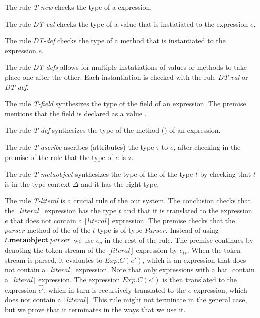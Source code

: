 The rule \textit{T-new} checks the type of a  expression. 

The rule \textit{DT-val} checks the type of a value that is instatiated to the expression $e$.

The rule \textit{DT-def} checks the type of a method  that is instantiated to the expression $e$.

The rule \textit{DT-defs} allows for multiple instatiations of values or methods to take place one after the other. Each instantiation is checked with the rule \textit{DT-val} or \textit{DT-def}.

The rule \textit{T-field} synthesizes the type of the field of an expression. The premise mentions that the field is declared as a value .

The rule \textit{T-def}  synthesizes the type of the method () of an expression. 

The rule \textit{T-ascribe} ascribes (attributes) the type $\tau$ to $e$, after checking in the premise of the rule that the type of $e$ is $\tau$.

The rule \textit{T-metaobject} synthesizes the type of the  of the type $t$ by checking that $t$ is in the type context $\Delta$ and it has the right type.

The rule \textit{T-literal} is a crucial rule of the our system. The conclusion checks that the $\lfloor literal \rfloor$ expression has the type $t$ and that it is translated to the expression $e$ that does not contain a $\lfloor literal \rfloor$ expression. The premise checks that the $parser$ method of the  of the $t$ type is of type $Parser$. Instead of using $t.\textbf{metaobject}.parser$ we use $e_p$ in the rest of the rule. The premise continues by denoting the token stream of the $\lfloor literal \rfloor$ expression by $e_{ts}$. When the token stream is parsed, it evaluates to $Exp.C(e')$, which is an expression that does not contain a $\lfloor literal \rfloor$ expression. Note that only expressions with a hat $\hat{}$ contain a $\lfloor literal \rfloor$ expression. The expression $Exp.C(e')$ is then translated to the expression $\hat{e'}$, which in turn is recursively translated to the $e$ expression, which does not contain a $\lfloor literal \rfloor$. This rule might not terminate in the general case, but we prove that it terminates in the ways that we use it.














